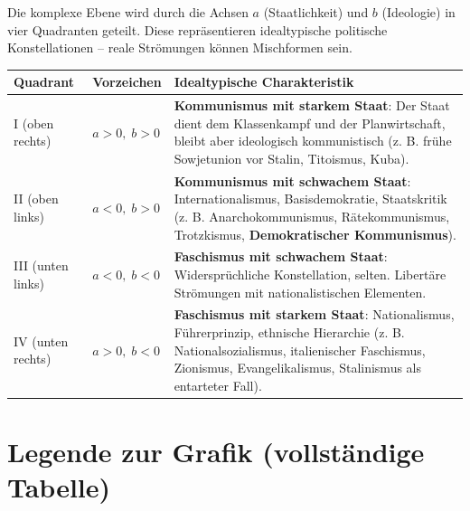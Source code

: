 \documentclass[12pt, a4paper]{article}
\begin{document}
Die komplexe Ebene wird durch die Achsen \(a\) (Staatlichkeit) und \(b\) (Ideologie) in vier Quadranten geteilt. Diese repräsentieren idealtypische politische Konstellationen – reale Strömungen können Mischformen sein.

\noindent
\begin{tabular}{p{2.5cm}p{3cm}p{8cm}}
\toprule
\textbf{Quadrant} & \textbf{Vorzeichen} & \textbf{Idealtypische Charakteristik} \\
\midrule
I (oben rechts) & \(a > 0,\; b > 0\) & \textbf{Kommunismus mit starkem Staat}: Der Staat dient dem Klassenkampf und der Planwirtschaft, bleibt aber ideologisch kommunistisch (z. B. frühe Sowjetunion vor Stalin, Titoismus, Kuba). \\
II (oben links) & \(a < 0,\; b > 0\) & \textbf{Kommunismus mit schwachem Staat}: Internationalismus, Basisdemokratie, Staatskritik (z. B. Anarchokommunismus, Rätekommunismus, Trotzkismus, \textbf{Demokratischer Kommunismus}). \\
III (unten links) & \(a < 0,\; b < 0\) & \textbf{Faschismus mit schwachem Staat}: Widersprüchliche Konstellation, selten. Libertäre Strömungen mit nationalistischen Elementen. \\
IV (unten rechts) & \(a > 0,\; b < 0\) & \textbf{Faschismus mit starkem Staat}: Nationalismus, Führerprinzip, ethnische Hierarchie (z. B. Nationalsozialismus, italienischer Faschismus, Zionismus, Evangelikalismus, Stalinismus als entarteter Fall). \\
\bottomrule
\end{tabular}

\section*{Legende zur Grafik (vollständige Tabelle)}
\end{document}
